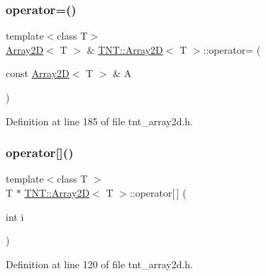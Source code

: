 \subsubsection{\texorpdfstring{operator=()}{operator=()}\hspace{0.1cm}{\footnotesize\ttfamily [2/2]}}
{\footnotesize\ttfamily template$<$class T$>$ \\
\hyperlink{classTNT_1_1Array2D}{Array2D}$<$ T $>$ \& \hyperlink{classTNT_1_1Array2D}{T\+N\+T\+::\+Array2D}$<$ T $>$\+::operator= (\begin{DoxyParamCaption}\item[{const \hyperlink{classTNT_1_1Array2D}{Array2D}$<$ T $>$ \&}]{A }\end{DoxyParamCaption})\hspace{0.3cm}{\ttfamily [inline]}}



Definition at line 185 of file tnt\+\_\+array2d.\+h.

\mbox{\label{classTNT_1_1Array2D_a472e0ff84ff7767033dc847a7a9c34cd}} 
\subsubsection{\texorpdfstring{operator[]()}{operator[]()}\hspace{0.1cm}{\footnotesize\ttfamily [1/2]}}
{\footnotesize\ttfamily template$<$class T $>$ \\
T $\ast$ \hyperlink{classTNT_1_1Array2D}{T\+N\+T\+::\+Array2D}$<$ T $>$\+::operator\mbox{[}$\,$\mbox{]} (\begin{DoxyParamCaption}\item[{int}]{i }\end{DoxyParamCaption})\hspace{0.3cm}{\ttfamily [inline]}}



Definition at line 120 of file tnt\+\_\+array2d.\+h.

\mbox{\label{classTNT_1_1Array2D_ac1394cbc900adcec3233ff231d9eea4a}} 
